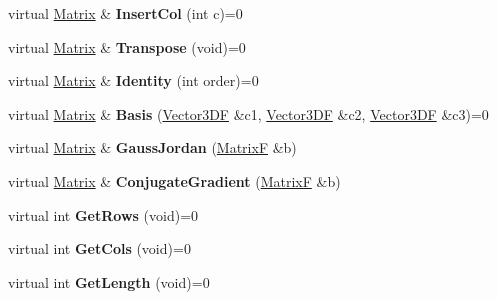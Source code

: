 \begin{DoxyCompactItemize}
\item 
\hypertarget{class_matrix_af8834d15e392273baf4eb89049423560}{virtual \hyperlink{class_matrix}{Matrix} \& {\bfseries Insert\+Col} (int c)=0}\label{class_matrix_af8834d15e392273baf4eb89049423560}

\item 
\hypertarget{class_matrix_ae2f3932bb9eaf592bee0791609a90718}{virtual \hyperlink{class_matrix}{Matrix} \& {\bfseries Transpose} (void)=0}\label{class_matrix_ae2f3932bb9eaf592bee0791609a90718}

\item 
\hypertarget{class_matrix_a4674401c8ba94ccb968da8acbbd16b72}{virtual \hyperlink{class_matrix}{Matrix} \& {\bfseries Identity} (int order)=0}\label{class_matrix_a4674401c8ba94ccb968da8acbbd16b72}

\item 
\hypertarget{class_matrix_acb7acb9521469adb98fc2e735aa91012}{virtual \hyperlink{class_matrix}{Matrix} \& {\bfseries Basis} (\hyperlink{class_vector3_d_f}{Vector3\+D\+F} \&c1, \hyperlink{class_vector3_d_f}{Vector3\+D\+F} \&c2, \hyperlink{class_vector3_d_f}{Vector3\+D\+F} \&c3)=0}\label{class_matrix_acb7acb9521469adb98fc2e735aa91012}

\item 
\hypertarget{class_matrix_adba425049740a99e7d2b58bf3ebfa213}{virtual \hyperlink{class_matrix}{Matrix} \& {\bfseries Gauss\+Jordan} (\hyperlink{class_matrix_f}{Matrix\+F} \&b)}\label{class_matrix_adba425049740a99e7d2b58bf3ebfa213}

\item 
\hypertarget{class_matrix_a92be25cb7fcdd9326f6a4d136fe018c6}{virtual \hyperlink{class_matrix}{Matrix} \& {\bfseries Conjugate\+Gradient} (\hyperlink{class_matrix_f}{Matrix\+F} \&b)}\label{class_matrix_a92be25cb7fcdd9326f6a4d136fe018c6}

\item 
\hypertarget{class_matrix_a4902116737e5998d6ea460a01de3399b}{virtual int {\bfseries Get\+Rows} (void)=0}\label{class_matrix_a4902116737e5998d6ea460a01de3399b}

\item 
\hypertarget{class_matrix_a7d108f346d7a9d5f2dc67f055435a4f3}{virtual int {\bfseries Get\+Cols} (void)=0}\label{class_matrix_a7d108f346d7a9d5f2dc67f055435a4f3}

\item 
\hypertarget{class_matrix_a02f4f885e97449866e0a4dbccf33a81c}{virtual int {\bfseries Get\+Length} (void)=0}\label{class_matrix_a02f4f885e97449866e0a4dbccf33a81c}


\end{DoxyCompactItemize}
